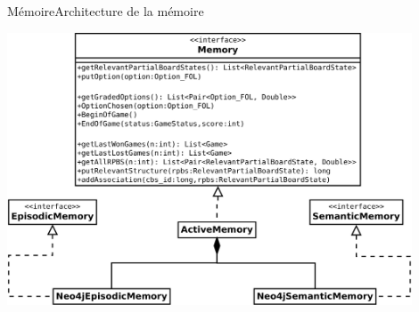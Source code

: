 \begin{frame}{Mémoire}{Architecture de la mémoire}
\begin{center}
\includegraphics[width=0.9\textwidth]{img/implementation_memory/interface}
\end{center}
\end{frame}

